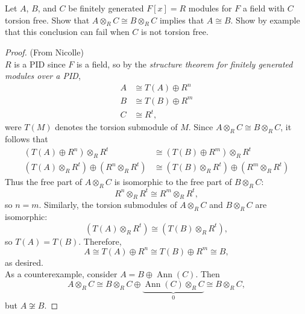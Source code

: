 \documentclass{article}
\newenvironment{problem}[2][Problem]{\begin{trivlist}
\item[\hskip \labelsep {\bfseries #1}\hskip \labelsep {\bfseries #2.}]}{\end{trivlist}}
\newcommand{\Ann}{\operatorname{Ann}}
\begin{document}
\begin{problem}{2}
  Let $A$, $B$, and $C$ be finitely generated $F[x] = R$ modules for $F$ a field
  with $C$ torsion free. Show that $A \otimes_R C \cong B \otimes_R C$ implies
  that $A \cong B$.
  Show by example that this conclusion can fail when $C$ is not torsion free.
\end{problem}
\begin{proof}(From Nicolle)\\
  $R$ is a PID since $F$ is a field, so by the
  \textit{structure theorem for finitely generated modules over a PID},
  \begin{align*}
    A &\cong T(A) \oplus R^n \\
    B &\cong T(B) \oplus R^m \\
    C &\cong R^t,
  \end{align*} were $T(M)$ denotes the torsion submodule of $M$.
  Since $A \otimes_R C \cong B \otimes_R C$, it follows that \begin{align*}
    (T(A) \oplus R^n) \otimes_R R^t &\cong (T(B) \oplus R^m) \otimes_R R^t \\
    (T(A) \otimes_R R^t) \oplus (R^n \otimes_R R^t) &\cong (T(B) \otimes_R R^t) \oplus (R^m \otimes_R R^t)
  \end{align*}
  Thus the free part of $A \otimes_R C$ is isomorphic to the free part of
  $B \otimes_R C$: \[
    R^n \otimes_R R^t \cong R^m \otimes_R R^t,
  \] so $n = m$. Similarly, the torsion submodules of $A \otimes_R C$ and
  $B \otimes_R C$ are isomorphic: \[
    (T(A) \otimes_R R^t) \cong (T(B) \otimes_R R^t),
  \] so $T(A) = T(B)$. Therefore, \[
    A \cong T(A) \oplus R^n \cong T(B) \oplus R^m \cong B,
  \] as desired.
  \\

  As a counterexample, consider $A = B \oplus \Ann(C)$. Then \[
    A \otimes_R C
    \cong B \otimes_R C \oplus \underbrace{\Ann(C) \otimes_R C}_0
    \cong B \otimes_R C,
  \] but $A \not\cong B$.
\end{proof}
\pagebreak
\end{document}
